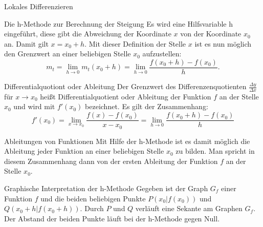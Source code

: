 \begin{section}{Lokales Differenzieren}
\label{hmethode}
\begin{merke*}{Die h-Methode zur Berechnung der Steigung }{}
Es wird eine Hilfsvariable h eingeführt, diese gibt die Abweichung der Koordinate $x$ von der Koordinate $x_0$ an. Damit gilt $x=x_0 + h$. Mit dieser Definition der Stelle $x$ ist es nun möglich den Grenzwert an einer beliebigen Stelle $x_0$ aufzustellen: $$m_t =\lim_{h\rightarrow 0} m_t(x_0 +h) =\lim_{h\rightarrow 0} \dfrac{f(x_0 + h) - f(x_0)}{h}.$$
\end{merke*}
\begin{defi}{Differentialquotiont oder Ableitung}{} 
    Der Grenzwert des Differenzenquotienten $\frac{\Delta y}{\Delta x}$ für $x\rightarrow x_0$ heißt Differentialquotient oder Ableitung der Funktion $f$ an der Stelle $x_0$ und wird mit $f'(x_0)$ bezeichnet. Es gilt der Zusammenhang:$$f'(x_0) = \lim_{x\rightarrow x_0} \dfrac{f(x) - f(x_0)}{x - x_0} = \lim_{h\rightarrow 0} \dfrac{f(x_0 +h) - f(x_0)}{h}$$
\end{defi}
\begin{bem*}{Ableitungen von Funktionen}{}
Mit Hilfe der h-Methode ist es damit möglich die Ableitung jeder Funktion an einer beliebigen Stelle $x_0$ zu bilden. Man spricht in diesem Zusammenhang dann von der ersten Ableitung der Funktion $f$ an der Stelle $x_0$.
\end{bem*}
\begin{bsp}{Graphische Interpretation der h-Methode}{}
Gegeben ist der Graph $G_f$ einer Funktion $f$ und die beiden beliebigen Punkte $P(x_0|f(x_0))$ und $Q(x_0+h|f(x_0+h))$. Durch $P$ und $Q$ verläuft eine Sekante am Graphen $G_f$. Der Abstand der beiden Punkte läuft bei der h-Methode gegen Null. 
  \begin{center}
\end{center}
\end{bsp}
\end{section}
